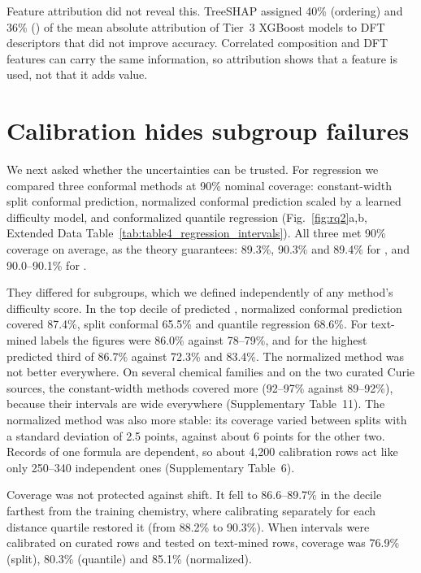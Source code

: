 \documentclass[11pt,a4paper]{article}
\begin{document}
Feature attribution did not reveal this. TreeSHAP\cite{lundberg2017shap,lundberg2020treeshap} assigned 40\% (ordering) and 36\% (\Tc{}) of the mean absolute attribution of Tier~3 XGBoost models to DFT descriptors that did not improve accuracy. Correlated composition and DFT features can carry the same information, so attribution shows that a feature is used, not that it adds value.

\section*{Calibration hides subgroup failures}\label{sec:rq2}

We next asked whether the uncertainties can be trusted. For regression we compared three conformal methods\cite{vovk2005algorithmic,lei2018distribution,angelopoulos2023gentle} at 90\% nominal coverage: constant-width split conformal prediction, normalized conformal prediction scaled by a learned difficulty model\cite{papadopoulos2011normalized}, and conformalized quantile regression\cite{romano2019cqr} (Fig.~\ref{fig:rq2}a,b, Extended Data Table~\ref{tab:table4_regression_intervals}). All three met 90\% coverage on average, as the theory guarantees: 89.3\%, 90.3\% and 89.4\% for \Tc{}, and 90.0--90.1\% for \mcell{}.

They differed for subgroups, which we defined independently of any method's difficulty score. In the top decile of predicted \Tc{}, normalized conformal prediction covered 87.4\%, split conformal 65.5\% and quantile regression 68.6\%. For text-mined labels the figures were 86.0\% against 78--79\%, and for the highest predicted third of \mcell{} 86.7\% against 72.3\% and 83.4\%. The normalized method was not better everywhere. On several chemical families and on the two curated Curie sources, the constant-width methods covered more (92--97\% against 89--92\%), because their intervals are wide everywhere (Supplementary Table~11). The normalized method was also more stable: its \Tc{} coverage varied between splits with a standard deviation of 2.5 points, against about 6 points for the other two. Records of one formula are dependent, so about 4,200 calibration rows act like only 250--340 independent ones (Supplementary Table~6).

Coverage was not protected against shift. It fell to 86.6--89.7\% in the decile farthest from the training chemistry, where calibrating separately for each distance quartile restored it (from 88.2\% to 90.3\%). When intervals were calibrated on curated rows and tested on text-mined rows, \Tc{} coverage was 76.9\% (split), 80.3\% (quantile) and 85.1\% (normalized).
\end{document}
